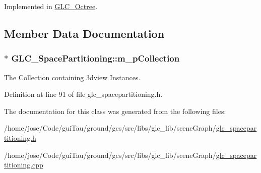 Implemented in \hyperlink{class_g_l_c___octree_ac789b028df6982b7749e04a4ea117faa}{G\-L\-C\-\_\-\-Octree}.



\subsection{Member Data Documentation}
\hypertarget{class_g_l_c___space_partitioning_a0bb65cbb45559bcec79bfa32c8f261a9}{
\subsubsection[{m\-\_\-p\-Collection}]{$\ast$ G\-L\-C\-\_\-\-Space\-Partitioning\-::m\-\_\-p\-Collection\hspace{0.3cm}{\ttfamily [protected]}}}\label{class_g_l_c___space_partitioning_a0bb65cbb45559bcec79bfa32c8f261a9}


The Collection containing 3dview Instances. 



Definition at line 91 of file glc\-\_\-spacepartitioning.\-h.



The documentation for this class was generated from the following files\-:\begin{DoxyCompactItemize}
\item 
/home/jose/\-Code/gui\-Tau/ground/gcs/src/libs/glc\-\_\-lib/scene\-Graph/\hyperlink{glc__spacepartitioning_8h}{glc\-\_\-spacepartitioning.\-h}\item 
/home/jose/\-Code/gui\-Tau/ground/gcs/src/libs/glc\-\_\-lib/scene\-Graph/\hyperlink{glc__spacepartitioning_8cpp}{glc\-\_\-spacepartitioning.\-cpp}\end{DoxyCompactItemize}

